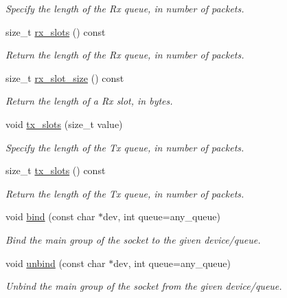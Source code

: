 \begin{DoxyCompactItemize}
\begin{DoxyCompactList}\small\item\em Specify the length of the Rx queue, in number of packets. \end{DoxyCompactList}\item 
size\+\_\+t \hyperlink{classpfq_1_1socket_a34d80296c96c3e727f437d0be1b81dd8}{rx\+\_\+slots} () const
\begin{DoxyCompactList}\small\item\em Return the length of the Rx queue, in number of packets. \end{DoxyCompactList}\item 
size\+\_\+t \hyperlink{classpfq_1_1socket_ac46fe8e1ba3313003dc3e4ee1411ef63}{rx\+\_\+slot\+\_\+size} () const
\begin{DoxyCompactList}\small\item\em Return the length of a Rx slot, in bytes. \end{DoxyCompactList}\item 
void \hyperlink{classpfq_1_1socket_a019d15a072c043d6a1333ca0c836da4c}{tx\+\_\+slots} (size\+\_\+t value)
\begin{DoxyCompactList}\small\item\em Specify the length of the Tx queue, in number of packets. \end{DoxyCompactList}\item 
size\+\_\+t \hyperlink{classpfq_1_1socket_a99c77a5c33e925f47f47c51b384e4fda}{tx\+\_\+slots} () const
\begin{DoxyCompactList}\small\item\em Return the length of the Tx queue, in number of packets. \end{DoxyCompactList}\item 
void \hyperlink{classpfq_1_1socket_a3a0fc5c70e2d2615e29d06ac55007ed3}{bind} (const char $\ast$dev, int queue=any\+\_\+queue)
\begin{DoxyCompactList}\small\item\em Bind the main group of the socket to the given device/queue. \end{DoxyCompactList}\item 
void \hyperlink{classpfq_1_1socket_af53d407f46ba2b4d143782ff7d585758}{unbind} (const char $\ast$dev, int queue=any\+\_\+queue)
\begin{DoxyCompactList}\small\item\em Unbind the main group of the socket from the given device/queue. \end{DoxyCompactList}\item 

\end{DoxyCompactItemize}
